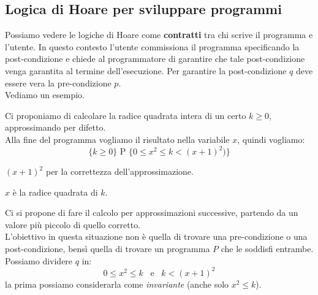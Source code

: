 				      					      			\subsection{Logica di Hoare per sviluppare programmi}
				      					      			Possiamo vedere le logiche di Hoare come \textbf{contratti} tra chi scrive il
				      					      			programma e l'utente. In questo contesto l'utente commissiona il programma
				      					      			specificando la post-condizione e chiede al programmatore di garantire che tale
				      					      			post-condizione venga garantita al termine dell'esecuzione. Per garantire la
				      					      			post-condizione $q$ deve essere vera la pre-condizione $p$.\\
				      					      			Vediamo un esempio.
				      					      			\begin{esempio}
				      					      				Ci proponiamo di calcolare la radice quadrata intera di un certo $k\geq 0$,
				      					      				approssimando per difetto.\\
				      					      				Alla fine del programma vogliamo il risultato nella variabile $x$, quindi
				      					      				vogliamo:
				      					      				\[\{k\geq 0\}\mbox{ P }\{0\leq x^2\leq k<(x+1)^2)\}\]
				      					      			\begin{nota}
				      					      				 $(x+1)^2$ per la correttezza dell'approssimazione.
				      					      			\end{nota}
				      					      			\begin{nota}
				      					      			     $x$ è la radice quadrata di $k$.
				      					      			\end{nota}
				      					      				Ci si propone di fare il calcolo per approssimazioni successive, partendo da
				      					      				un valore più piccolo di quello corretto.\\
				      					      				L'obiettivo in questa situazione non è quella di trovare una pre-condizione o una post-condizione, bensì quella di trovare un programma $P$ che le soddisfi entrambe. \\
				      					      				Possiamo dividere $q$ in:
				      					      				\[0\leq x^2\leq k \,\,\,\mbox{ e }\,\,\, k<(x+1)^2\]
				      					      				la prima possiamo considerarla come \textit{invariante} (anche solo $x^2\leq
				      					      				k$).\\
				      					      								      					      				  

\end{esempio}
